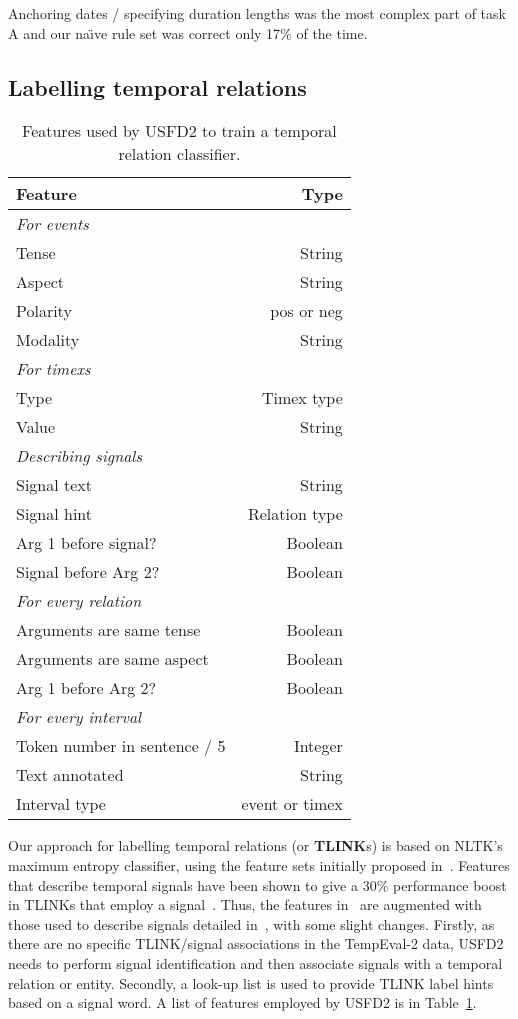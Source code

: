 \documentclass[11pt]{article}
\begin{document}
Anchoring dates / specifying duration lengths was the most complex part of task A and our na\"{\i}ve rule set was correct only 17\% of the time.

\subsection{Labelling temporal relations}
\label{tlink} 

\begin{table}
\begin{center}
\caption{Features used by USFD2 to train a temporal relation classifier.}
\label{tab:features}
\small
\begin{tabular}{| l | r |}
\hline
\textbf{Feature} & \textbf{Type} \\
\hline
\emph{For events} & \\
Tense & String \\
Aspect & String \\
Polarity & pos or neg \\
Modality & String \\
\hline
\emph{For timexs} & \\
Type & Timex type \\
Value & String \\
\hline
\emph{Describing signals} & \\
Signal text & String \\
Signal hint & Relation type \\
Arg 1 before signal? & Boolean \\
Signal before Arg 2? & Boolean \\
\hline
\emph{For every relation} & \\
Arguments are same tense & Boolean \\
Arguments are same aspect & Boolean \\
Arg 1 before Arg 2? & Boolean \\
\hline
\emph{For every interval} & \\
Token number in sentence / 5 & Integer \\
Text annotated & String \\
Interval type & event or timex \\
\hline
\end{tabular}
\end{center}
\end{table}
\normalsize

Our approach for labelling temporal relations (or \textbf{TLINK}s) is based on NLTK's maximum entropy classifier, using the feature sets initially proposed in~. Features that describe temporal signals have been shown to give a 30\% performance boost in TLINKs that employ a signal~\cite{derczynski2010signals}. Thus, the features in~ are augmented with those used to describe signals detailed in~, with some slight changes. Firstly, as there are no specific TLINK/signal associations in the TempEval-2 data, USFD2 needs to perform signal identification and then associate signals with a temporal relation or entity. Secondly, a look-up list is used to provide TLINK label hints based on a signal word. A list of features employed by USFD2 is in Table~\ref{tab:features}.
\end{document}
